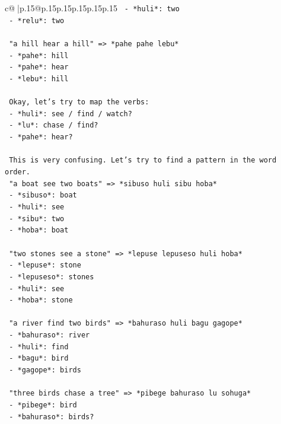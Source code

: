 \documentclass{article}
\begin{document}
{\begin{supertabular}{c@{$\;$}|p{.15\linewidth}@{}p{.15\linewidth}p{.15\linewidth}p{.15\linewidth}p{.15\linewidth}p{.15\linewidth}}
{{{\texttt{   {-} *huli*: two} \\
\texttt{   {-} *relu*: two} \\
\\ 
\texttt{   "a hill hear a hill" => *pahe pahe lebu*} \\
\texttt{   {-} *pahe*: hill} \\
\texttt{   {-} *pahe*: hear} \\
\texttt{   {-} *lebu*: hill} \\
\\ 
\texttt{   Okay, let's try to map the verbs:} \\
\texttt{   {-} *huli*: see / find / watch?} \\
\texttt{   {-} *lu*: chase / find?} \\
\texttt{   {-} *pahe*: hear?} \\
\\ 
\texttt{   This is very confusing. Let's try to find a pattern in the word order.} \\
\texttt{   "a boat see two boats" => *sibuso huli sibu hoba*} \\
\texttt{   {-} *sibuso*: boat} \\
\texttt{   {-} *huli*: see} \\
\texttt{   {-} *sibu*: two} \\
\texttt{   {-} *hoba*: boat} \\
\\ 
\texttt{   "two stones see a stone" => *lepuse lepuseso huli hoba*} \\
\texttt{   {-} *lepuse*: stone} \\
\texttt{   {-} *lepuseso*: stones} \\
\texttt{   {-} *huli*: see} \\
\texttt{   {-} *hoba*: stone} \\
\\ 
\texttt{   "a river find two birds" => *bahuraso huli bagu gagope*} \\
\texttt{   {-} *bahuraso*: river} \\
\texttt{   {-} *huli*: find} \\
\texttt{   {-} *bagu*: bird} \\
\texttt{   {-} *gagope*: birds} \\
\\ 
\texttt{   "three birds chase a tree" => *pibege bahuraso lu sohuga*} \\
\texttt{   {-} *pibege*: bird} \\
\texttt{   {-} *bahuraso*: birds?} \\
}}}
\end{supertabular}}
\end{document}
